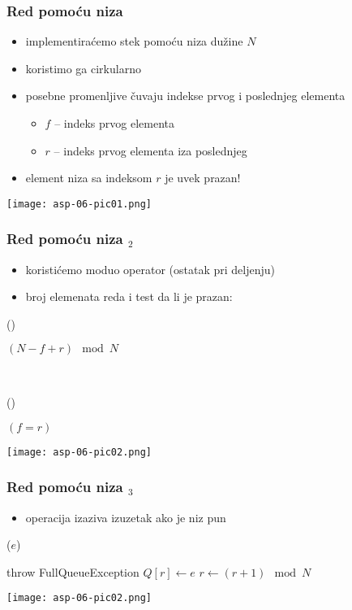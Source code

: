 \documentclass[compress,aspectratio=169]{beamer}
\begin{document}
\begin{frame}[fragile]
  \frametitle{Red pomoću niza}
  \begin{itemize}
    \item implementiraćemo stek pomoću niza dužine $N$
    \item koristimo ga cirkularno
    \item posebne promenljive čuvaju indekse prvog i poslednjeg elementa
    \begin{itemize}
      \item $f$ -- indeks prvog elementa
      \item $r$ -- indeks prvog elementa iza poslednjeg
    \end{itemize}
    \item element niza sa indeksom $r$ je uvek prazan!      
  \end{itemize}
  \begin{center}
    \texttt{[image: asp-06-pic01.png]}
  \end{center}
\end{frame}

\begin{frame}[fragile]
  \frametitle{Red pomoću niza $_2$}
  \begin{itemize}
    \item koristićemo moduo operator (ostatak pri deljenju)
    \item broj elemenata reda i test da li je prazan:
  \end{itemize}
()
\begin{algorithmic}
\RETURN $(N-f+r) \mod N$
\end{algorithmic}

\ %

()
\begin{algorithmic}
\RETURN $(f=r)$
\end{algorithmic}
\begin{center}
  \texttt{[image: asp-06-pic02.png]}
\end{center}
\end{frame}

\begin{frame}[fragile]
  \frametitle{Red pomoću niza $_3$}
  \begin{itemize}
    \item operacija  izaziva izuzetak ako je niz pun
  \end{itemize}
($e$)
\begin{algorithmic}
  \STATE throw FullQueueException
\ELSE
  \STATE $Q[r] \leftarrow e$
  \STATE $r \leftarrow (r+1)\mod N$
\ENDIF
\end{algorithmic}
\begin{center}
  \texttt{[image: asp-06-pic02.png]}
\end{center}
\end{frame}
\end{document}
